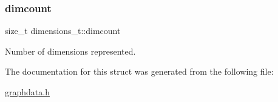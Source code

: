 \subsubsection{\texorpdfstring{dimcount}{dimcount}}
{\footnotesize\ttfamily size\+\_\+t dimensions\+\_\+t\+::dimcount}

Number of dimensions represented. 

The documentation for this struct was generated from the following file\+:\begin{DoxyCompactItemize}
\item 
\hyperlink{graphdata_8h}{graphdata.\+h}\end{DoxyCompactItemize}
